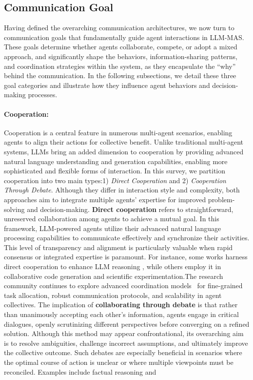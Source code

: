 \subsection{Communication Goal}
Having defined the overarching communication architectures, we now turn to communication goals that fundamentally guide agent interactions in LLM-MAS. These goals determine whether agents collaborate, compete, or adopt a mixed approach, and significantly shape the behaviors, information-sharing patterns, and coordination strategies within the system, as they encapsulate the “why” behind the communication. In the following subsections, we detail these three goal categories and illustrate how they influence agent behaviors and decision-making processes.

\paragraph{Cooperation:}Cooperation is a central feature in numerous multi-agent scenarios, enabling agents to align their actions for collective benefit. Unlike traditional multi-agent systems, LLMs bring an added dimension to cooperation by providing advanced natural language understanding and generation capabilities, enabling more sophisticated and flexible forms of interaction.  In this survey, we partition cooperation into two main types:1) \emph{Direct Cooperation} and 2) \emph{Cooperation Through Debate}. Although they differ in interaction style and complexity, both approaches aim to integrate multiple agents’ expertise for improved problem-solving and decision-making. \textbf{Direct cooperation} refers to straightforward, unreserved collaboration among agents to achieve a mutual goal. In this framework, LLM-powered agents utilize their advanced natural language processing capabilities to communicate effectively and synchronize their activities. This level of transparency and alignment is particularly valuable when rapid consensus or integrated expertise is paramount. For instance,   some works harness direct cooperation to enhance LLM reasoning\cite{boostrapping,casualgpt_reasoning,autoagents} ,  while others employ it in collaborative code generation \cite{chatdev_software_development,soa_code_generation,magis_mas_for_github,mas_for_software_2,fixagent_mas_for_debug} and scientific experimentation\cite{chatsim_mas_make_scene,mas_use_tool}.The research community continues to explore advanced coordination models~\cite{agentcoord,govsim,mas_benchmark} for fine-grained task allocation, robust communication protocols, and scalability in agent collectives. The implication of \textbf{collaborating through debate} is that rather than unanimously accepting each other’s information, agents engage in critical dialogues, openly scrutinizing different perspectives before converging on a refined solution. Although this method may appear confrontational, its overarching aim is to resolve ambiguities, challenge incorrect assumptions, and ultimately improve the collective outcome. Such debates are especially beneficial in scenarios where the optimal course of action is unclear or where multiple viewpoints must be reconciled. Examples include factual reasoning\cite{debate_improve_llm_1} and 